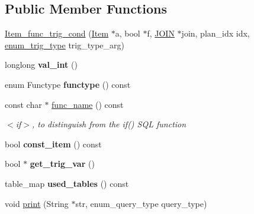 \subsection*{Public Member Functions}
\begin{DoxyCompactItemize}
\item 
\mbox{\hyperlink{classItem__func__trig__cond_a3cc1ff4f7de6a721a3ea2017bc6f03c9}{Item\+\_\+func\+\_\+trig\+\_\+cond}} (\mbox{\hyperlink{classItem}{Item}} $\ast$a, bool $\ast$f, \mbox{\hyperlink{classJOIN}{J\+O\+IN}} $\ast$join, plan\+\_\+idx idx, \mbox{\hyperlink{classItem__func__trig__cond_a1e9dc4e0397faf1caecedcd02df5e8c9}{enum\+\_\+trig\+\_\+type}} trig\+\_\+type\+\_\+arg)
\item 
\mbox{\label{classItem__func__trig__cond_a632170154ec6ed732d1c8f450ea131e0}} 
longlong {\bfseries val\+\_\+int} ()
\item 
\mbox{\label{classItem__func__trig__cond_abd350c44a733fb0cf8a2d477e6323034}} 
enum Functype {\bfseries functype} () const
\item 
\mbox{\label{classItem__func__trig__cond_a0f5a5af37bce80c40f7e71f951de9e97}} 
const char $\ast$ \mbox{\hyperlink{classItem__func__trig__cond_a0f5a5af37bce80c40f7e71f951de9e97}{func\+\_\+name}} () const
\begin{DoxyCompactList}\small\item\em \textquotesingle{}$<$if$>$\textquotesingle{}, to distinguish from the if() S\+QL function \end{DoxyCompactList}\item 
\mbox{\label{classItem__func__trig__cond_a8d7d3a02714590bda4568c59a4b48d12}} 
bool {\bfseries const\+\_\+item} () const
\item 
\mbox{\label{classItem__func__trig__cond_ad093265a92b7e49f316206115a7435f4}} 
bool $\ast$ {\bfseries get\+\_\+trig\+\_\+var} ()
\item 
\mbox{\label{classItem__func__trig__cond_a17bbc8460728247d712faee5e5a9450c}} 
table\+\_\+map {\bfseries used\+\_\+tables} () const
\item 
void \mbox{\hyperlink{classItem__func__trig__cond_afa6900d80f97abb71f1e710c02d83d8a}{print}} (String $\ast$str, enum\+\_\+query\+\_\+type query\+\_\+type)
\end{DoxyCompactItemize}
